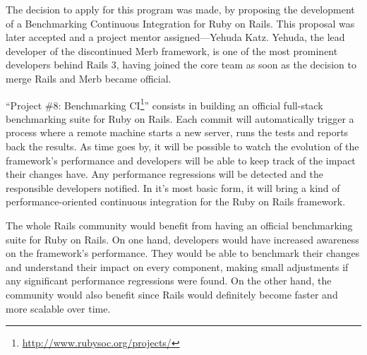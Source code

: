 The decision to apply for this program was made, by proposing the development of a Benchmarking Continuous Integration for Ruby on Rails. This proposal was later accepted and a project mentor assigned---Yehuda Katz. Yehuda, the lead developer of the discontinued Merb framework, is one of the most prominent developers behind Rails 3, having joined the core team as soon as the decision to merge Rails and Merb became official.

``Project \#8: Benchmarking CI\footnote{\url{http://www.rubysoc.org/projects/}}'' consists in building an official full-stack benchmarking suite for Ruby on Rails. Each commit will automatically trigger a process where a remote machine starts a new server, runs the tests and reports back the results. As time goes by, it will be possible to watch the evolution of the framework's performance and developers will be able to keep track of the impact their changes have. Any performance regressions will be detected and the responsible developers notified. In it's most basic form, it will bring a kind of performance-oriented continuous integration for the Ruby on Rails framework.

The whole Rails community would benefit from having an official benchmarking suite for Ruby on Rails. On one hand, developers would have increased awareness on the framework's performance. They would be able to benchmark their changes and understand their impact on every component, making small adjustments if any significant performance regressions were found. On the other hand, the community would also benefit since Rails would definitely become faster and more scalable over time.

